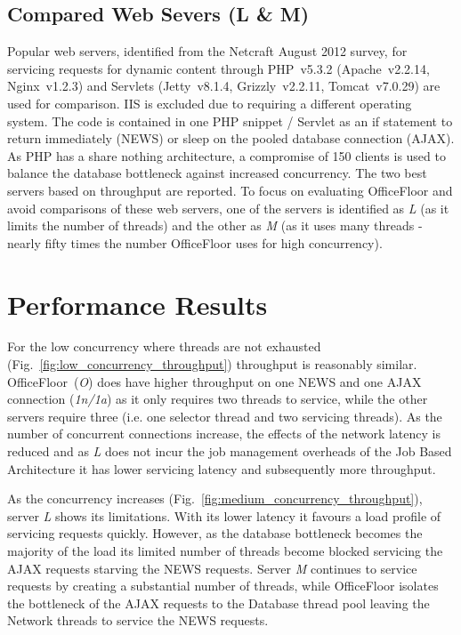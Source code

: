 \documentclass[conference]{ieee/IEEEtran}
\begin{document}
\subsection{Compared Web Severs (L \& M)}
Popular web servers, identified from the Netcraft August 2012 survey, for
servicing requests for dynamic content through PHP~v5.3.2 (Apache~v2.2.14,
Nginx~v1.2.3) and Servlets (Jetty~v8.1.4, Grizzly~v2.2.11, Tomcat~v7.0.29) are
used for comparison.  IIS is excluded due to requiring a different operating
system.  The code is contained in one PHP snippet / Servlet as an if statement
to return immediately (NEWS) or sleep on the pooled database connection (AJAX).
As PHP has a share nothing architecture, a compromise of 150 clients is used to
balance the database bottleneck against increased concurrency.  The two best
servers based on throughput are reported.  To focus on evaluating OfficeFloor
and avoid comparisons of these web servers, one of the servers is identified as
\textit{L} (as it limits the number of threads) and the other as \textit{M} (as
it uses many threads - nearly fifty times the number OfficeFloor uses for high
concurrency).



\section{Performance Results}
For the low concurrency where threads are not exhausted
(Fig.~\ref{fig:low_concurrency_throughput}) throughput is reasonably similar.
OfficeFloor~(\textit{O}) does have higher throughput on one NEWS and one AJAX
connection (\textit{1n/1a}) as it only requires two threads to service, while
the other servers require three (i.e. one selector thread and two servicing
threads).  As the number of concurrent connections increase, the effects of the
network latency is reduced and as \textit{L} does not incur the job management
overheads of the Job Based Architecture it has lower servicing latency and
subsequently more throughput.

As the concurrency increases (Fig.~\ref{fig:medium_concurrency_throughput}),
server \textit{L} shows its limitations.  With its lower latency it favours a
load profile of servicing requests quickly.  However, as the database bottleneck
becomes the majority of the load its limited number of threads become blocked
servicing the AJAX requests starving the NEWS requests.  Server \textit{M}
continues to service requests by creating a substantial number of threads, while
OfficeFloor isolates the bottleneck of the AJAX requests to the Database thread
pool leaving the Network threads to service the NEWS requests.
\end{document}
